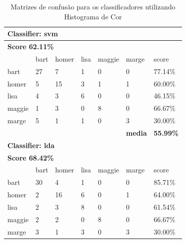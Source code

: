 \documentclass[paper=a4, fontsize=11pt]{scrartcl} %
\numberwithin{equation}{section} %
\numberwithin{figure}{section} %
\numberwithin{table}{section} %
\begin{document}
\begin{table}[!htb]
\centering
\caption{Matrizes de confusão para os classificadores utilizando Histograma de Cor}
\label{tbl:colorhistogram}
\begin{tabular}{l|l|l|l|l|l|l}
\hline
\multicolumn{7}{l}{\textbf{Classifier: svm}}                                                \\ \hline
\multicolumn{7}{l}{\textbf{Score 62.11\%}}                                                  \\ \hline
          & bart      & homer     & lisa      & maggie    & marge          & score            \\ \hline
bart      & 27        & 7         & 1         & 0         & 0              & 77.14\%          \\ \hline
homer     & 5         & 15        & 3         & 1         & 1              & 60.00\%          \\ \hline
lisa      & 4         & 3         & 6         & 0         & 0              & 46.15\%          \\ \hline
maggie    & 1         & 3         & 0         & 8         & 0              & 66.67\%          \\ \hline
marge     & 5         & 1         & 1         & 0         & 3              & 30.00\%          \\ \hline
          &           &           & \textbf{} & \textbf{} & \textbf{media} & \textbf{55.99\%} \\ \hline
\multicolumn{7}{l}{\textbf{Classifier: lda}}                                                \\ \hline
\multicolumn{7}{l}{\textbf{Score 68.42\%}}                                                  \\ \hline
          & bart      & homer     & lisa      & maggie    & marge          & score            \\ \hline
bart      & 30        & 4         & 1         & 0         & 0              & 85.71\%          \\ \hline
homer     & 2         & 16        & 6         & 0         & 1              & 64.00\%          \\ \hline
lisa      & 2         & 3         & 8         & 0         & 0              & 61.54\%          \\ \hline
maggie    & 2         & 2         & 0         & 8         & 0              & 66.67\%          \\ \hline
marge     & 3         & 1         & 3         & 0         & 3              & 30.00\%          \\ \hline

\end{tabular}
\end{table}
\end{document}
